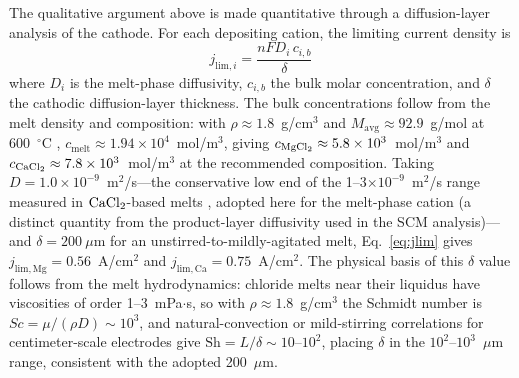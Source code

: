 \documentclass[11pt]{article}
\begin{document}
The qualitative argument above is made quantitative through a diffusion-layer analysis of the cathode. For each depositing cation, the limiting current density is
\begin{equation}
\label{eq:jlim}
j_{\mathrm{lim},i} = \frac{n F D_i\, c_{i,b}}{\delta}
\end{equation}
where $D_i$ is the melt-phase diffusivity, $c_{i,b}$ the bulk molar concentration, and $\delta$ the cathodic diffusion-layer thickness. The bulk concentrations follow from the melt density and composition: with $\rho \approx 1.8$~g/cm$^3$ and $M_{\mathrm{avg}} \approx 92.9$~g/mol at 600~$^{\circ}$C \cite{sato1999}, $c_{\mathrm{melt}} \approx 1.94\times10^{4}$~mol/m$^3$, giving $c_{\ce{MgCl2}} \approx 5.8\times10^{3}$~mol/m$^3$ and $c_{\ce{CaCl2}} \approx 7.8\times10^{3}$~mol/m$^3$ at the recommended composition. Taking $D = 1.0\times10^{-9}$~m$^2$/s---the conservative low end of the 1--3$\times10^{-9}$~m$^2$/s range measured in $\ce{CaCl2}$-based melts \cite{fray2000,yan2007}, adopted here for the melt-phase cation (a distinct quantity from the product-layer diffusivity used in the SCM analysis)---and $\delta = 200~\mu$m for an unstirred-to-mildly-agitated melt, Eq.~\ref{eq:jlim} gives $j_{\mathrm{lim,Mg}} = 0.56$~A/cm$^2$ and $j_{\mathrm{lim,Ca}} = 0.75$~A/cm$^2$. The physical basis of this $\delta$ value follows from the melt hydrodynamics: chloride melts near their liquidus have viscosities of order 1--3~mPa$\cdot$s, so with $\rho \approx 1.8$~g/cm$^3$ the Schmidt number is $Sc = \mu/(\rho D) \sim 10^{3}$, and natural-convection or mild-stirring correlations for centimeter-scale electrodes give $\mathrm{Sh} = L/\delta \sim 10$--$10^{2}$, placing $\delta$ in the $10^{2}$--$10^{3}$~$\mu$m range, consistent with the adopted 200~$\mu$m.
\end{document}
